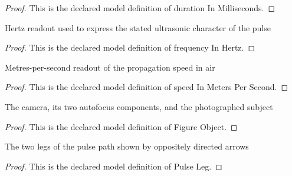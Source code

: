 \begin{proof}
  This is the declared model definition of duration In Milliseconds.
\end{proof}
\begin{definition}
  \label{def:physics:phyx-mini-0211:phyxminiproblems-problemphyxmini0211-frequencyinhertz}
  Hertz readout used to express the stated ultrasonic character of the pulse
\end{definition}
\begin{proof}
  This is the declared model definition of frequency In Hertz.
\end{proof}
\begin{definition}
  \label{def:physics:phyx-mini-0211:phyxminiproblems-problemphyxmini0211-speedinmeterspersecond}
  Metres-per-second readout of the propagation speed in air
\end{definition}
\begin{proof}
  This is the declared model definition of speed In Meters Per Second.
\end{proof}
\begin{definition}
  \label{def:physics:phyx-mini-0211:phyxminiproblems-problemphyxmini0211-figureobject}
  The camera, its two autofocus components, and the photographed subject
\end{definition}
\begin{proof}
  This is the declared model definition of Figure Object.
\end{proof}
\begin{definition}
  \label{def:physics:phyx-mini-0211:phyxminiproblems-problemphyxmini0211-pulseleg}
  The two legs of the pulse path shown by oppositely directed arrows
\end{definition}
\begin{proof}
  This is the declared model definition of Pulse Leg.
\end{proof}
